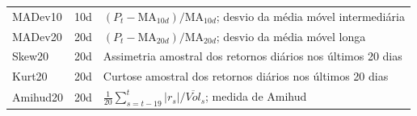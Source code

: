 \begin{table}[htbp]
{\begin{tabular}{lcp{9cm}}
        MADev10    & 10d   & $(P_t - \text{MA}_{10d}) / \text{MA}_{10d}$; desvio da média móvel intermediária \\
        MADev20    & 20d   & $(P_t - \text{MA}_{20d}) / \text{MA}_{20d}$; desvio da média móvel longa \\
        Skew20     & 20d   & Assimetria amostral dos retornos diários nos últimos 20 dias \\
        Kurt20     & 20d   & Curtose amostral dos retornos diários nos últimos 20 dias \\
        Amihud20   & 20d   & $\frac{1}{20}\sum_{s=t-19}^{t} |r_s| / \overline{Vol}_{s}$; medida de Amihud \\
        \bottomrule
    \end{tabular}}
\end{table}